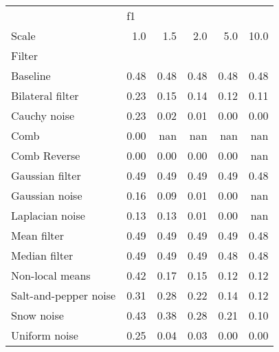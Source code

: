 \begin{tabular}{lrrrrr}
\toprule
{} & \multicolumn{5}{l}{f1} \\
Scale & 1.0  & 1.5  & 2.0  & 5.0  & 10.0 \\
Filter                &      &      &      &      &      \\
\midrule
Baseline              & 0.48 & 0.48 & 0.48 & 0.48 & 0.48 \\
Bilateral filter      & 0.23 & 0.15 & 0.14 & 0.12 & 0.11 \\
Cauchy noise          & 0.23 & 0.02 & 0.01 & 0.00 & 0.00 \\
Comb                  & 0.00 &  nan &  nan &  nan &  nan \\
Comb Reverse          & 0.00 & 0.00 & 0.00 & 0.00 &  nan \\
Gaussian filter       & 0.49 & 0.49 & 0.49 & 0.49 & 0.48 \\
Gaussian noise        & 0.16 & 0.09 & 0.01 & 0.00 &  nan \\
Laplacian noise       & 0.13 & 0.13 & 0.01 & 0.00 &  nan \\
Mean filter           & 0.49 & 0.49 & 0.49 & 0.49 & 0.48 \\
Median filter         & 0.49 & 0.49 & 0.49 & 0.48 & 0.48 \\
Non-local means       & 0.42 & 0.17 & 0.15 & 0.12 & 0.12 \\
Salt-and-pepper noise & 0.31 & 0.28 & 0.22 & 0.14 & 0.12 \\
Snow noise            & 0.43 & 0.38 & 0.28 & 0.21 & 0.10 \\
Uniform noise         & 0.25 & 0.04 & 0.03 & 0.00 & 0.00 \\
\bottomrule
\end{tabular}
